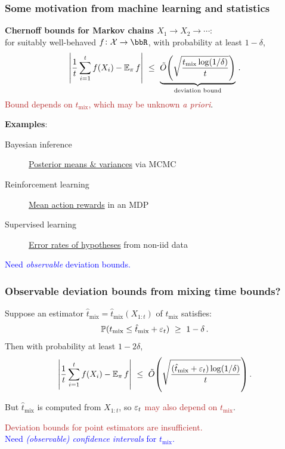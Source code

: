\documentclass[11pt,compress,blue4,notheorems]{beamer}
\newcommand{\BLUE}[1]{\textcolor{blue}{#1}}
\newcommand{\FIREBRICK}[1]{\textcolor{firebrick}{#1}}
\newcommand\tmix{\ensuremath{t_{\operatorname{mix}}}}
\newcommand\tmixhat{\ensuremath{\hat{t}_{\operatorname{mix}}}}
\newcommand\states{\ensuremath{\mathcal{X}}}
\begin{document}

\begin{frame}
  \frametitle{Some motivation from machine learning and statistics}

  \textbf{Chernoff bounds for Markov chains $X_1\to X_2\to\dotsb$}:
  \\
  for suitably well-behaved $f \colon \states \to \bbR$,
  with probability at least $1-\delta$,
  \[
    \Abs{
      \frac1t\sum_{i=1}^t f(X_i)
      -
      \E_\pi f
    }
    \ \leq \
    \underbrace{
      \tilde O\Parens{
        \sqrt{
          \frac{\tmix \log(1/\delta)}{t}
        }
      }
    }_{\text{deviation bound}}
    \,.
  \]
  \FIREBRICK{Bound depends on $\tmix$, which may be unknown \emph{a
  priori}}.

  \bigskip
  \textbf{Examples}:
  \begin{description}
    \item[Bayesian inference]
      \underline{Posterior means \& variances} via MCMC

    \item[Reinforcement learning]
      \underline{Mean action rewards} in an MDP

    \item[Supervised learning]
      \underline{Error rates of hypotheses} from non-iid data

  \end{description}

  \begin{center}
    \BLUE{%
      Need \emph{observable} deviation bounds.
    }
  \end{center}

\end{frame}


\begin{frame}
  \frametitle{Observable deviation bounds from mixing time bounds?}

  Suppose an estimator $\tmixhat = \tmixhat(X_{1:t})$ of
  $\tmix$ satisfies:
  \[
    \P(\tmix \leq \tmixhat + \veps_t)
    \ \geq \
    1-\delta
    \,.
  \]
  \onslide<2->
  Then with probability at least $1-2\delta$,
  \[
    \Abs{
      \frac1t\sum_{i=1}^t f(X_i)
      -
      \E_\pi f
    }
    \ \leq \
    \tilde O\Parens{
      \sqrt{
        \frac{\parens{\tmixhat + \veps_t} \log(1/\delta)}{t}
      }
    }
    \,.
  \]

  But $\tmixhat$ is computed from $X_{1:t}$, so
  \FIREBRICK{$\varepsilon_t$ may also depend on $\tmix$}.

  \onslide<4->
  \begin{center}
    \FIREBRICK{%
      Deviation bounds for point estimators are insufficient.%
    }
    \\
    \BLUE{%
      Need \emph{(observable) confidence intervals} for $\tmix$.%
    }
  \end{center}

\end{frame}
\end{document}
